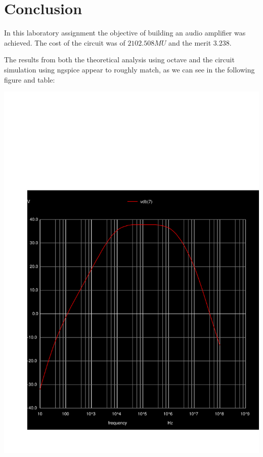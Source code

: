 \section{Conclusion}
\label{sec:conclusion}

In this laboratory assignment the objective of building an audio amplifier was achieved.
 The cost of the circuit was of $ 2102.508 MU$ and the merit $3.238$.
 
The results from both the theoretical analysis using octave and the circuit
simulation using ngspice appear to roughly match, as we can see in the following figure and table:



\begin{minipage}[c]{0.50\linewidth}
\includegraphics[width=1\linewidth]{../sim/vo2f.pdf}
\end{minipage} %
